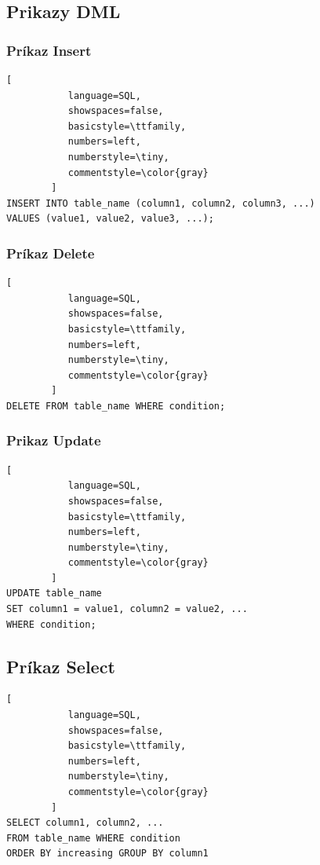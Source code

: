 \subsection{Prikazy \acl{DML}}
\subsubsection{Príkaz Insert}

\begin{lstlisting}[
           language=SQL,
           showspaces=false,
           basicstyle=\ttfamily,
           numbers=left,
           numberstyle=\tiny,
           commentstyle=\color{gray}           
        ]
INSERT INTO table_name (column1, column2, column3, ...)
VALUES (value1, value2, value3, ...);

\end{lstlisting}

\subsubsection{Príkaz Delete}

\begin{lstlisting}[
           language=SQL,
           showspaces=false,
           basicstyle=\ttfamily,
           numbers=left,
           numberstyle=\tiny,
           commentstyle=\color{gray}           
        ]
DELETE FROM table_name WHERE condition;

\end{lstlisting}

\subsubsection{Prikaz Update}
\begin{lstlisting}[
           language=SQL,
           showspaces=false,
           basicstyle=\ttfamily,
           numbers=left,
           numberstyle=\tiny,
           commentstyle=\color{gray}           
        ]
UPDATE table_name
SET column1 = value1, column2 = value2, ...
WHERE condition;

\end{lstlisting}

\subsection{Príkaz Select}

\begin{lstlisting}[
           language=SQL,
           showspaces=false,
           basicstyle=\ttfamily,
           numbers=left,
           numberstyle=\tiny,
           commentstyle=\color{gray}           
        ]
SELECT column1, column2, ...
FROM table_name WHERE condition 
ORDER BY increasing GROUP BY column1 

\end{lstlisting}

